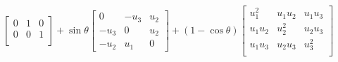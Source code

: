 \documentclass[11pt,a4paper]{article}
\begin{document}
\begin{enumerate}
\begin{enumerate}
\begin{align*}
\begin{bmatrix}
                                                          0 & 1 & 0 \\
                                                          0 & 0 & 1 \\
                                                      \end{bmatrix} + \sin{\theta} \begin{bmatrix}
                                                                                       0    & - u_3 & u_2 \\
                                                                                       -u_3 & 0     & u_2 \\
                                                                                       -u_2 & u_1   & 0
                                                                                   \end{bmatrix} + (1 - \cos{\theta}) \begin{bmatrix}
                                                                                                                          u_1^2   & u_1 u_2 & u_1 u_3 \\
                                                                                                                          u_1 u_2 & u_2^2   & u_2 u_3 \\
                                                                                                                          u_1 u_3 & u_2 u_3 & u_3^2   \\
                                                                                                                      \end{bmatrix} \\
                    \end{align*}
          \end{enumerate}

          \newpage

\end{enumerate}
\end{document}
